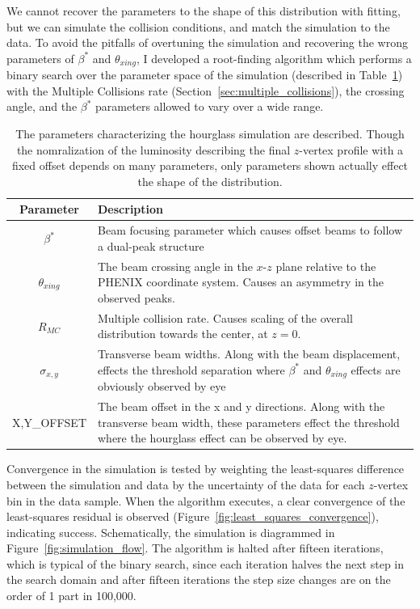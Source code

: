 We cannot recover the parameters to the shape of this distribution with fitting,
but we can simulate the collision conditions, and match the simulation to the
data. To avoid the pitfalls of overtuning the simulation and recovering the
wrong parameters of $\beta^*$ and $\theta_{xing}$, I developed a root-finding
algorithm which performs a binary search over the parameter space of the
simulation (described in Table~\ref{tab:hourglass_simulation_parameters}) with
the Multiple Collisions rate (Section~\ref{sec:multiple_collisions}), the
crossing angle, and the $\beta^*$ parameters allowed to vary over a wide range.  

\begin{table}[h]
  \centering
  \begin{tabular}{c p{10cm}}
    \toprule
    \textbf{Parameter} & \textbf{Description}\\
    \midrule
    $\beta^*$ & Beam focusing parameter which causes offset beams to follow a
    dual-peak structure \\
    $\theta_{xing}$ & The beam crossing angle in the $x$-$z$ plane relative to
    the PHENIX coordinate system. Causes an asymmetry in the observed peaks. \\
    $R_{MC}$ & Multiple collision rate. Causes scaling of the overall
    distribution towards the center, at $z=0$. \\
    $\sigma_{x,y}$ & Transverse beam widths. Along with the beam displacement,
    effects the threshold separation where $\beta^*$ and $\theta_{xing}$
    effects are obviously observed by eye \\
    {X,Y}\_OFFSET & The beam offset in the x and y directions. Along with the
    transverse beam width, these parameters effect the threshold where the
    hourglass effect can be observed by eye. \\
    \bottomrule
  \end{tabular}
  \caption{
    The parameters characterizing the hourglass simulation are described.
    Though the nomralization of the luminosity describing the final $z$-vertex
    profile with a fixed offset depends on many parameters, only parameters shown
    actually effect the shape of the distribution.
  }
  \label{tab:hourglass_simulation_parameters}
\end{table}

Convergence in the simulation is tested by weighting the least-squares
difference between the simulation and data by the uncertainty of the data for
each $z$-vertex bin in the data sample.  When the algorithm executes, a clear
convergence of the least-squares residual is observed
(Figure~\ref{fig:least_squares_convergence}), indicating success.
Schematically, the simulation is diagrammed in Figure~\ref{fig:simulation_flow}.
The algorithm is halted after fifteen iterations, which is typical of the binary
search, since each iteration halves the next step in the search domain and after
fifteen iterations the step size changes are on the order of 1 part in 100,000. 


